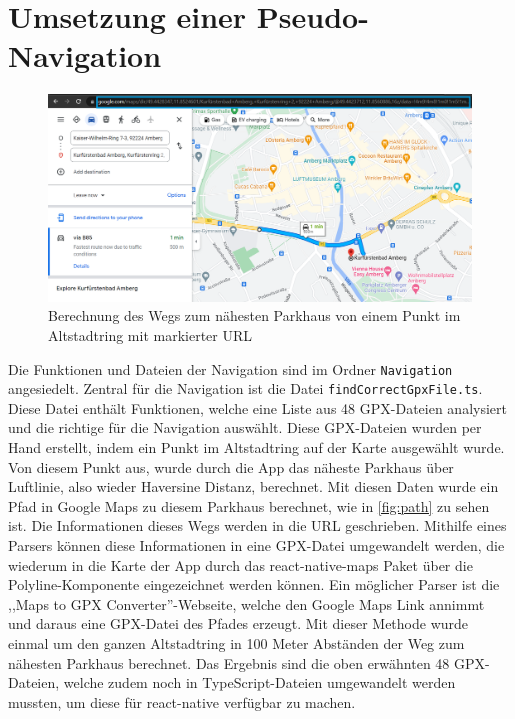 \chapter{Umsetzung einer Pseudo-Navigation}
\label{chap:5}

\begin{figure}
	\vspace{-\baselineskip}
	\centering
	\includegraphics[scale=0.3]{img/path}
	\caption{Berechnung des Wegs zum nähesten Parkhaus von einem Punkt im Altstadtring mit markierter URL}
	\label{fig:path}
\end{figure}
Die Funktionen und Dateien der Navigation sind im Ordner \verb|Navigation| angesiedelt. Zentral für die Navigation ist die Datei \verb|findCorrectGpxFile.ts|. Diese Datei enthält Funktionen, welche eine Liste aus 48 GPX-Dateien analysiert und die richtige für die Navigation auswählt. Diese GPX-Dateien wurden per Hand erstellt, indem ein Punkt im Altstadtring auf der Karte ausgewählt wurde. Von diesem Punkt aus, wurde durch die App das näheste Parkhaus über Luftlinie, also wieder Haversine Distanz, berechnet. Mit diesen Daten wurde ein Pfad in Google Maps zu diesem Parkhaus berechnet, wie in \autoref{fig:path} zu sehen ist. Die Informationen dieses Wegs werden in die URL geschrieben. Mithilfe eines Parsers können diese Informationen in eine GPX-Datei umgewandelt werden, die wiederum in die Karte der App durch das react-native-maps Paket über die Polyline-Komponente eingezeichnet werden können. Ein möglicher Parser ist die ,,Maps to GPX Converter''-Webseite, welche den Google Maps Link annimmt und daraus eine GPX-Datei des Pfades erzeugt. Mit dieser Methode wurde einmal um den ganzen Altstadtring in 100 Meter Abständen der Weg zum nähesten Parkhaus berechnet. Das Ergebnis sind die oben erwähnten 48 GPX-Dateien, welche zudem noch in TypeScript-Dateien umgewandelt werden mussten, um diese für react-native verfügbar zu machen.

